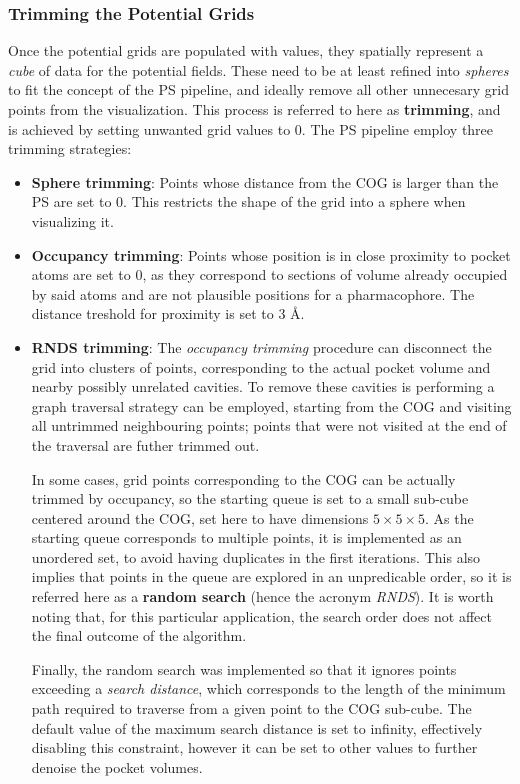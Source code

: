     \subsubsection{Trimming the Potential Grids}
      Once the potential grids are populated with values, they spatially represent a \textit{cube} of data for the potential fields. These need to be at least refined into \textit{spheres} to fit the concept of the PS pipeline, and ideally remove all other unnecesary grid points from the visualization. This process is referred to here as \textbf{trimming}, and is achieved by setting unwanted grid values to $0$. The PS pipeline employ three trimming strategies:

      \begin{itemize}
        \item \textbf{Sphere trimming}: Points whose distance from the COG is larger than the PS are set to $0$. This restricts the shape of the grid into a sphere when visualizing it.

        \item \textbf{Occupancy trimming}: Points whose position is in close proximity to pocket atoms are set to $0$, as they correspond to sections of volume already occupied by said atoms and are not plausible positions for a pharmacophore. The distance treshold for proximity is set to {3 \AA}.

        \item \textbf{RNDS trimming}: The \textit{occupancy trimming} procedure can disconnect the grid into clusters of points, corresponding to the actual pocket volume and nearby possibly unrelated cavities. To remove these cavities is performing a graph traversal strategy can be employed, starting from the COG and visiting all untrimmed neighbouring points; points that were not visited at the end of the traversal are futher trimmed out.

        In some cases, grid points corresponding to the COG can be actually trimmed by occupancy, so the starting queue is set to a small sub-cube centered around the COG, set here to have dimensions $5 \times 5 \times 5$. As the starting queue corresponds to multiple points, it is implemented as an unordered set, to avoid having duplicates in the first iterations. This also implies that points in the queue are explored in an unpredicable order, so it is referred here as a \textbf{random search} (hence the acronym \textit{RNDS}). It is worth noting that, for this particular application, the search order does not affect the final outcome of the algorithm.

        Finally, the random search was implemented so that it ignores points exceeding a \textit{search distance}, which corresponds to the length of the minimum path required to traverse from a given point to the COG sub-cube. The default value of the maximum search distance is set to infinity, effectively disabling this constraint, however it can be set to other values to further denoise the pocket volumes.

      \end{itemize}

